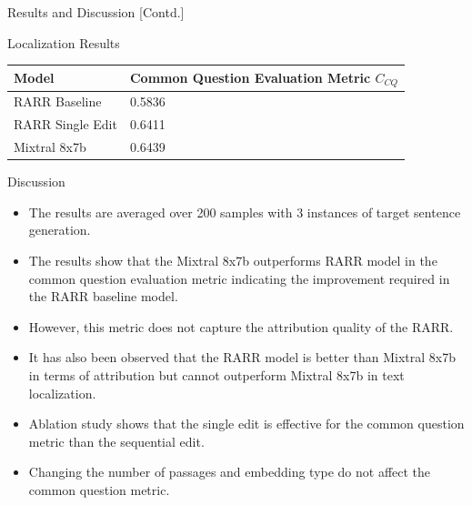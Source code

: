 \documentclass{beamer}
\begin{document}
	\begin{frame}{Results and Discussion [Contd.]}
		\begin{block}{\scriptsize Localization Results}\scriptsize
			\begin{table}
				\centering
				\begin{tabularx}{\textwidth}{XX}
					\hline 
					\textbf{Model} & \textbf{Common Question Evaluation Metric $C_{CQ}$}  \\ \hline
					RARR Baseline & 0.5836 \\
					RARR Single Edit &0.6411 \\
					Mixtral 8x7b & 0.6439 \\
					\hline
				\end{tabularx}
			\end{table}
		\end{block}
		\begin{block}{\scriptsize Discussion}\scriptsize
			\begin{itemize}
				\item The results are averaged over 200 samples with 3 instances of target sentence generation.
				\item The results show that the Mixtral 8x7b outperforms RARR model in the common question evaluation metric indicating the improvement required in the RARR baseline model. 
				\item However, this metric does not capture the attribution quality of the RARR. 
				\item It has also been observed that the RARR model is better than Mixtral 8x7b in terms of attribution but cannot outperform Mixtral 8x7b in text localization.
				\item Ablation study shows that the single edit is effective for the common question metric than the sequential edit.
				\item Changing the number of passages and embedding type do not affect the common question metric.
			\end{itemize}
		\end{block}
	\end{frame}
	
\end{document}
